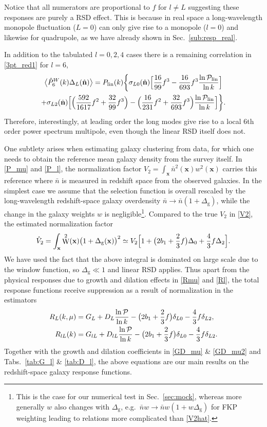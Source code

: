 \documentclass[a4paper,11pt]{article}
\let\d\relax
\DeclareMathOperator{\d}{d}
\DeclareMathOperator{\WS}{W}
\newcommand{\vx}{\mathbf{x}}
\newcommand{\los}{{\hat{\mathbf{n}}}}
\newcommand{\nbar}{\bar{n}}
\newcommand{\Plin}{P_\lin}
\newcommand{\Pdimless}{\mathcal{P}}
\newcommand{\D}{\frac{\d\ln\Pdimless}{\d\ln k}}
\newcommand{\Dlin}{\frac{\d\ln\Pdimless_\lin}{\d\ln k}}
\newcommand{\lin}{\mathrm{lin}}
\newcommand{\gal}{\mathrm{g}}
\begin{document}
Notice that all numerators are proportional to $f$ for $l\neq L$ suggesting
these responses are purely a RSD effect.
This is because in real space a long-wavelength monopole fluctuation ($L=0$)
can only give rise to a monopole ($l=0$) and likewise for quadrupole, as we
have already shown in Sec.~\ref{sub:resp_real}.

In addition to the tabulated $l=0,2,4$ cases there is a remaining correlation in
\eqref{3pt_red1} for $l=6$,
\begin{multline}
    \big\langle\hat P^W_6(k)\Delta_L(\los)\big\rangle = \Plin(k) \biggl\{
    \sigma_{L0}(\los) \Bigl[
        \frac{16}{99}f^3 - \frac{16}{693}f^3 \Dlin \Bigl] \\
    + \sigma_{L2}(\los) \Bigl[
        \Bigl(\frac{592}{1617}f^2 + \frac{32}{99}f^3\Bigr)
        - \Bigl(\frac{16}{231}f^2 + \frac{32}{693}f^3\Bigr) \Dlin \Bigl] \biggr\}.
\end{multline}
Therefore, interestingly, at leading order the long modes give rise to a
local 6th order power spectrum multipole, even though the linear RSD itself
does not.

One subtlety arises when estimating galaxy clustering from data, for which one
needs to obtain the reference mean galaxy density from the survey itself.
In \eqref{P_mu} and \eqref{P_l}, the normalization factor $V_2=\int_\vx
\nbar^2(\vx) w^2(\vx)$ carries this reference where $\nbar$ is measured in
redshift space from the observed galaxies.
In the simplest case we assume that the selection function is overall rescaled
by the long-wavelength redshift-space galaxy overdensity
$\nbar\to\nbar(1+\Delta_\gal)$, while the change in the galaxy weights $w$ is
negligible\footnote{This is the case for our numerical test in Sec.~\ref{sec:mock},
whereas more generally $w$ also changes with $\Delta_\gal$, e.g.\ $\nbar w \to
\nbar w (1+w\Delta_\gal)$ for FKP weighting leading to relations more complicated
than \eqref{V2hat}.}.
Compared to the true $V_2$ in \eqref{V2}, the estimated normalization factor
\begin{equation}
    \label{V2hat}
    \hat V_2 = \int_\vx \WS^2(\vx) \bigl(1+\Delta_\gal(\vx)\bigr)^2
    \simeq V_2 \Bigl[1 + \bigl(2b_1+\frac23f\bigr)\Delta_0 + \frac43f\Delta_2\Bigr].
\end{equation}
We have used the fact that the above integral is dominated on large scale due
to the window function, so $\Delta_\gal\ll1$ and linear RSD applies.
Thus apart from the physical responses due to growth and dilation effects in
\eqref{Rmu} and \eqref{Rl}, the total response functions receive suppression as
a result of normalization in the estimators
\begin{align}
    \label{Rmu_sup}
    R_L(k,\mu) &= G_L + D_L \D
    - \bigl(2b_1+\frac23f\bigr)\delta_{L0} - \frac43f\delta_{L2}, \\
    \label{Rl_sup}
    R_{lL}(k) &= G_{lL} + D_{lL} \D
    - \bigl(2b_1+\frac23f\bigr)\delta_{L0} - \frac43f\delta_{L2}.
\end{align}
Together with the growth and dilation coefficients in \eqref{GD_mu} \& \eqref{GD_mu2} and
Tabs.~\ref{tab:G_l} \& \ref{tab:D_l}, the above equations are our main results
on the redshift-space galaxy response functions.
\end{document}
